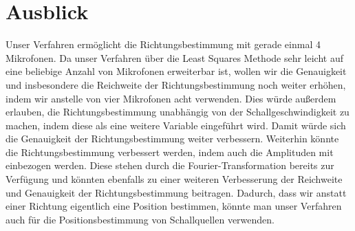 \section{Ausblick} 
Unser Verfahren ermöglicht die Richtungsbestimmung mit gerade einmal 4 Mikrofonen. Da unser Verfahren über die Least Squares Methode sehr leicht auf eine beliebige Anzahl von Mikrofonen erweiterbar ist, wollen wir die Genauigkeit und insbesondere die Reichweite der Richtungsbestimmung noch weiter erhöhen, indem wir anstelle von vier Mikrofonen acht verwenden. Dies würde außerdem erlauben, die Richtungsbestimmung unabhängig von der Schallgeschwindigkeit zu machen, indem diese als eine weitere Variable eingeführt wird. Damit würde sich die Genauigkeit der Richtungsbestimmung weiter verbessern.
Weiterhin könnte die Richtungsbestimmung verbessert werden, indem auch die Amplituden mit einbezogen werden. Diese stehen durch die Fourier-Transformation bereits zur Verfügung und könnten ebenfalls zu einer weiteren Verbesserung der Reichweite und Genauigkeit der Richtungsbestimmung beitragen.
Dadurch, dass wir anstatt einer Richtung eigentlich eine Position bestimmen, könnte man unser Verfahren auch für die Positionsbestimmung von Schallquellen verwenden.
